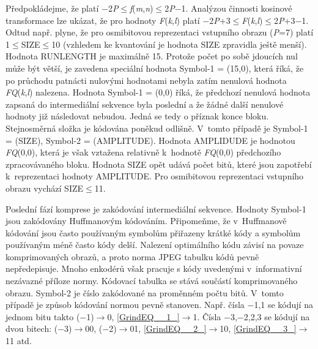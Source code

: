 \noindent Předpokládejme, že platí $-$2\textit{P}$\leq$\textit{f}(\textit{m},\textit{n})$\leq$2\textit{P}$-$1. Analýzou činnosti kosinové transformace lze ukázat, že pro hodnoty \textit{F}(\textit{k},\textit{l}) platí $-$2\textit{P}+3$\leq$\textit{F}(\textit{k},\textit{l})$\leq$2\textit{P}+3$-$1. Odtud např. plyne, že pro osmibitovou reprezentaci vstupního obrazu (\textit{P}=7) platí 1$\leq$SIZE$\leq$10 (vzhledem ke kvantování je hodnota SIZE zpravidla ještě menší). Hodnota RUNLENGTH je maximálně 15. Protože počet po sobě jdoucích nul může být větší, je zavedena speciální hodnota Symbol-1 = (15,0), která říká, že po průchodu patnácti nulovými hodnotami nebyla zatím nenulová hodnota \textit{FQ}(\textit{k},\textit{l}) nalezena. Hodnota Symbol-1 = (0,0) říká, že předchozí nenulová hodnota zapsaná do intermediální sekvence byla poslední a že žádné další nenulové hodnoty již následovat nebudou. Jedná se tedy o příznak konce bloku. Stejnosměrná složka je kódována poněkud odlišně. V~tomto případě je Symbol-1 = (SIZE), Symbol-2 = (AMPLITUDE). Hodnota AMPLIDUDE je hodnotou \textit{FQ}(0,0), která je však vztažena relativně k~hodnotě \textit{FQ}(0,0) předchozího zpracovávaného bloku. Hodnota SIZE opět udává počet bitů, které jsou zapotřebí k~reprezentaci hodnoty AMPLITUDE. Pro osmibitovou reprezentaci vstupního obrazu vychází SIZE$\leq$11.

\noindent 

\noindent Poslední fází komprese je zakódování intermediální sekvence. Hodnoty Symbol-1 jsou zakódovány Huffmanovým kódováním. Připomeňme, že v~Huffmanově kódování jsou často používaným symbolům přiřazeny krátké kódy a symbolům používaným méně často kódy delší. Nalezení optimálního kódu závisí na povaze komprimovaných obrazů, a proto norma JPEG tabulku kódů pevně nepředepisuje. Mnoho enkodérů však pracuje s kódy uvedenými v~informativní nezávazné příloze normy. Kódovací tabulka se stává součástí komprimovaného obrazu. Symbol-2 je číslo zakódované na proměnném počtu bitů. V~tomto případě je způsob kódování normou pevně stanoven. Např. čísla $-$1,1 se kódují na jednom bitu takto ($-$1)$\rightarrow$0, \eqref{GrindEQ__1_}$\rightarrow$1. Čísla $-$3,$-$2,2,3 se kódují na dvou bitech: ($-$3)$\rightarrow$00, ($-$2)$\rightarrow$01, \eqref{GrindEQ__2_}$\rightarrow$10, \eqref{GrindEQ__3_}$\rightarrow$11 atd.

\noindent 

